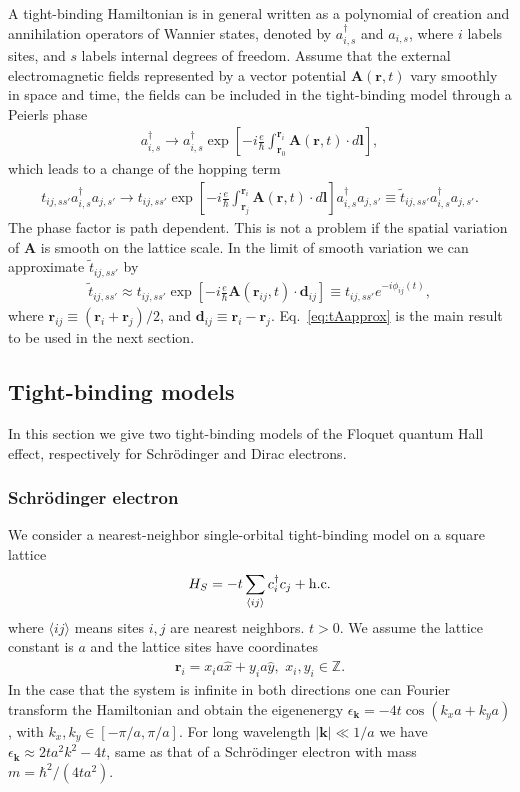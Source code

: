 \documentclass[aps,pra,preprint,showpacs]{revtex4-1}
\begin{document}
A tight-binding Hamiltonian is in general written as a polynomial of creation and annihilation operators of Wannier states, denoted by $a_{i,s}^\dag$ and $a_{i,s}$, where $i$ labels sites, and $s$ labels internal degrees of freedom. Assume that the external electromagnetic fields represented by a vector potential $\bm A(\bm r, t)$ vary smoothly in space and time, the fields can be included in the tight-binding model through a Peierls phase
\begin{eqnarray}
	a_{i,s}^\dag \rightarrow a_{i,s}^\dag \exp\left[- i\frac{e}{\hbar} \int_{\bm r_0}^{\bm r_i}  \bm A(\bm r, t) \cdot d\bm l \right],
\end{eqnarray}
which leads to a change of the hopping term
\begin{eqnarray}\label{eq:tintA}
	t_{ij,ss'} a_{i,s}^\dag a_{j,s'} \rightarrow t_{ij,ss'}  \exp\left[- i\frac{e}{\hbar} \int_{\bm r_j}^{\bm r_i}  \bm A(\bm r, t) \cdot d\bm l \right] a_{i,s}^\dag a_{j,s'} \equiv \tilde{t}_{ij,ss'}  a_{i,s}^\dag a_{j,s'}.
\end{eqnarray}
The phase factor is path dependent. This is not a problem if the spatial variation of $\bm A$ is smooth on the lattice scale. In the limit of smooth variation we can approximate $\tilde{t}_{ij,ss'} $ by 
\begin{eqnarray}\label{eq:tAapprox}
	\tilde{t}_{ij,ss'} \approx t_{ij,ss'}  \exp\left[- i\frac{e}{\hbar} \bm A(\bm r_{ij}, t) \cdot \bm d_{ij} \right] \equiv t_{ij,ss'} e^{-i \phi_{ij}(t)},
\end{eqnarray}
where $\bm r_{ij} \equiv (\bm r_i + \bm r_j)/2$, and $\bm d_{ij} \equiv \bm r_i - \bm r_j$. Eq.~\ref{eq:tAapprox} is the main result to be used in the next section.

\subsection{Tight-binding models}
In this section we give two tight-binding models of the Floquet quantum Hall effect, respectively for Schr\"{o}dinger and Dirac electrons.

\subsubsection{Schr\"{o}dinger electron}
We consider a nearest-neighbor single-orbital tight-binding model on a square lattice
\begin{eqnarray}
	H_S = -t \sum_{\langle ij \rangle} c_{i}^\dag c_j + {\rm h.c.} 
\end{eqnarray}
where $\langle ij \rangle$ means sites $i, j$ are nearest neighbors. $t > 0$. We assume the lattice constant is $a$ and the lattice sites have coordinates
\begin{eqnarray}
	\bm r_{i} = x_i a \hat{x} + y_i a \hat{y},\,\, x_i, y_i \in \mathbb{Z}.
\end{eqnarray} 
In the case that the system is infinite in both directions one can Fourier transform the Hamiltonian and obtain the eigenenergy $\epsilon_{\bm k} = -4t\cos(k_x a + k_y a)$, with $k_x, k_y \in [-\pi/a, \pi/a]$. For long wavelength $|\bm k|\ll 1/a$ we have $\epsilon_{\bm k} \approx 2ta^2 k^2 -4t$, same as that of a Schr\"{o}dinger electron with mass $m = \hbar^2/(4ta^2)$.
\end{document}
